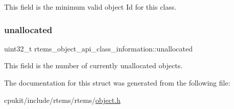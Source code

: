 This field is the minimum valid object Id for this class. \mbox{\label{structrtems__object__api__class__information_a3af6e877ce2b011d34a92a9c1cc51b06}} 
\subsubsection{\texorpdfstring{unallocated}{unallocated}}
{\footnotesize\ttfamily uint32\+\_\+t rtems\+\_\+object\+\_\+api\+\_\+class\+\_\+information\+::unallocated}

This field is the number of currently unallocated objects. 

The documentation for this struct was generated from the following file\+:\begin{DoxyCompactItemize}
\item 
cpukit/include/rtems/rtems/\mbox{\hyperlink{rtems_2object_8h}{object.\+h}}\end{DoxyCompactItemize}

